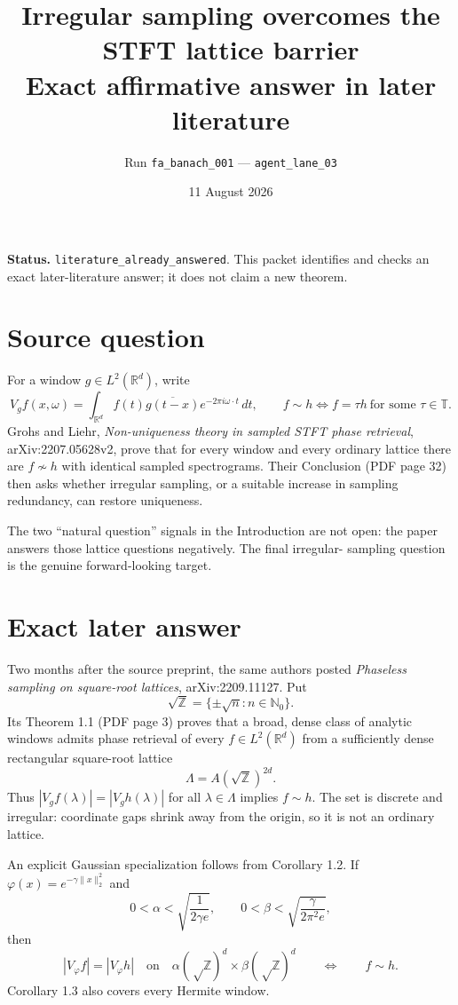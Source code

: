 \documentclass[11pt]{article}
\title{Irregular sampling overcomes the STFT lattice barrier\\
\large Exact affirmative answer in later literature}
\author{Run \texttt{fa\_banach\_001} --- \texttt{agent\_lane\_03}}
\date{11 August 2026}
\newcommand{\R}{\mathbb R}
\newcommand{\Z}{\mathbb Z}
\newcommand{\N}{\mathbb N}
\newcommand{\T}{\mathbb T}
\begin{document}
\maketitle

\textbf{Status.} \texttt{literature\_already\_answered}.  This packet
identifies and checks an exact later-literature answer; it does not claim a
new theorem.

\section*{Source question}

For a window $g\in L^2(\R^d)$, write
\[
 V_gf(x,\omega)=\int_{\R^d}f(t)\overline{g(t-x)}
 e^{-2\pi i\omega\cdot t}\,dt,
 \qquad f\sim h\iff f=\tau h\ \text{for some }\tau\in\T.
\]
Grohs and Liehr, \emph{Non-uniqueness theory in sampled STFT phase
retrieval}, arXiv:2207.05628v2, prove that for every window and every
ordinary lattice there are $f\not\sim h$ with identical sampled
spectrograms.  Their Conclusion (PDF page 32) then asks whether irregular
sampling, or a suitable increase in sampling redundancy, can restore
uniqueness.

The two ``natural question'' signals in the Introduction are not open: the
paper answers those lattice questions negatively.  The final irregular-
sampling question is the genuine forward-looking target.

\section*{Exact later answer}

Two months after the source preprint, the same authors posted
\emph{Phaseless sampling on square-root lattices}, arXiv:2209.11127.  Put
\[
 \sqrt{\Z}=\{\pm\sqrt n:n\in\N_0\}.
\]
Its Theorem 1.1 (PDF page 3) proves that a broad, dense class of analytic
windows admits phase retrieval of every $f\in L^2(\R^d)$ from a sufficiently
dense rectangular square-root lattice
\[
 \Lambda=A(\sqrt{\Z})^{2d}.
\]
Thus $|V_gf(\lambda)|=|V_gh(\lambda)|$ for all $\lambda\in\Lambda$ implies
$f\sim h$.  The set is discrete and irregular: coordinate gaps shrink away
from the origin, so it is not an ordinary lattice.

An explicit Gaussian specialization follows from Corollary 1.2.  If
$\varphi(x)=e^{-\gamma\lVert x\rVert_2^2}$ and
\[
 0<\alpha<\sqrt{\frac1{2\gamma e}},\qquad
 0<\beta<\sqrt{\frac{\gamma}{2\pi^2e}},
\]
then
\[
 |V_\varphi f|=|V_\varphi h|
 \quad\text{on}\quad
 \alpha(\sqrt\Z)^d\times\beta(\sqrt\Z)^d
 \qquad\Longleftrightarrow\qquad f\sim h.
\]
Corollary 1.3 also covers every Hermite window.
\end{document}
